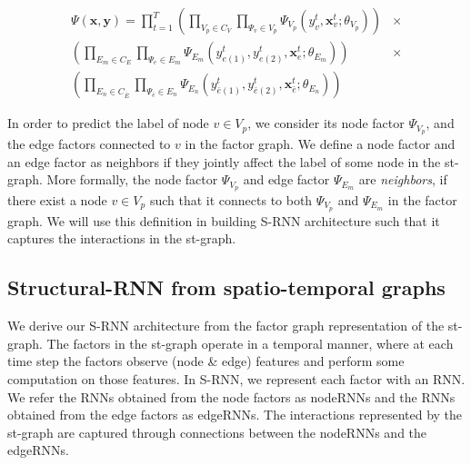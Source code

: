 \documentclass[10pt,twocolumn,letterpaper]{article}
\newcommand{\ve}[1]{\mathbf{#1}}
\newcommand{\mcal}[1]{\mathcal{#1}}
\begin{document}
\begin{align}
	\nonumber \Psi(\ve{x},\ve{y})  = \prod_{t=1}^T  \left (\prod_{V_p \in C_V}\prod_{\Psi_v \in V_p} \Psi_{V_p}(y_v^t,\ve{x}_v^t;\theta_{V_p})\right) &\times \\
	\nonumber \left (\prod_{E_m \in C_E }\prod_{\Psi_e \in E_m} \Psi_{E_m}(y_{e(1)}^t,y_{e(2)}^t,\ve{x}_e^t;\theta_{E_m})\right)&\times\\
	\left (\prod_{E_n \in C_{\bar{E}} }\prod_{\Psi_{\bar{e}} \in E_n} \Psi_{E_n}(y_{\bar{e}(1)}^t,y_{\bar{e}(2)}^t,\ve{x}_{\bar{e}}^t;\theta_{E_n})\right)&
\end{align}\fi

In order to predict the label of node $v \in V_p$, we consider its node factor $\Psi_{V_p}$, and the edge factors connected to $v$ in the factor graph. We define a node factor and an edge factor as neighbors if they jointly affect the label of some node in the st-graph. More formally, the node factor $\Psi_{V_p}$ and edge factor $\Psi_{E_m}$ are \textit{neighbors}, if there exist a node $v \in {V_p}$ such that it connects to both $\Psi_{V_p}$ and $\Psi_{E_m}$ in the factor graph. We will use this definition in building S-RNN architecture such that it captures the interactions in the st-graph.

\iffalse
A node's label in the st-graph is affected by the factors the node is connected to in the factor-graph. We define {neighbor factors} to group the factors which jointly affect the node labels.  The node factor $\Psi_{V_p}$ and edge factor $\Psi_{E_m}$ are \textit{neighbors}, if there exist a node $v \in {V}$ such that it connects to both $\Psi_{V_p}$ and $\Psi_{E_m}$ in the factor graph. This definition will be instrumental in building the S-RNN architecture such that it captures the interactions in the st-graph.

\begin{align}
	\nonumber \Psi_{V_p} \;\&\; \Psi_{E_m}\; &\text{are neighbors} \Longleftrightarrow \\
	\label{eq:neighbor} &\exists v \in V_p, u \in \mcal{V}\; \text{s.t.}\; (u,v) \in E_m
\end{align}\fi\vspace{1\subsectionReduceTop}\subsection{Structural-RNN from spatio-temporal graphs}\vspace{1\subsectionReduceBot}\label{subsec:srnn}
We derive our S-RNN architecture from the factor graph representation of the st-graph. The factors in the st-graph operate in a temporal manner, where at each time step the factors observe (node \& edge) features and perform some computation on those features. In S-RNN, we represent each factor with an RNN. We refer the RNNs obtained from the node factors as nodeRNNs and the RNNs obtained from the edge factors as edgeRNNs. The interactions represented by the st-graph are captured through connections between the nodeRNNs and the edgeRNNs. 
\end{document}

